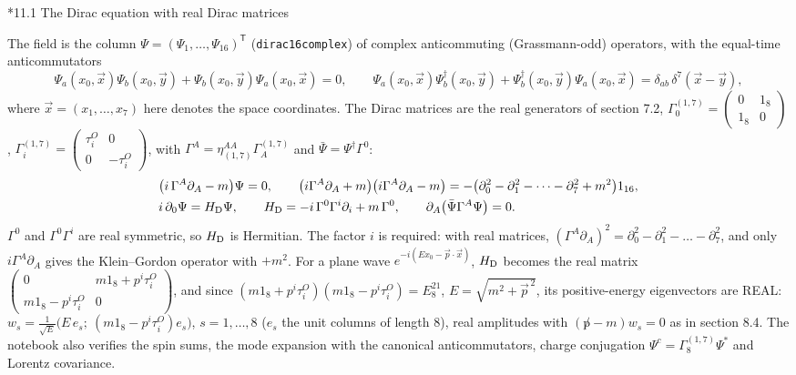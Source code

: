 \documentclass[10pt,a4paper]{article}
\makeatletter
\renewcommand\subsection{\@startsection{subsection}{2}{\z@}{-3.25ex\@plus -1ex \@minus -.2ex}{1.5ex \@plus .2ex}{\normalfont\large\bfseries\raggedright}}
\makeatother
\begin{document}
\subsection*{11.1 The Dirac equation with real Dirac matrices}
The field is the column $\Psi=(\Psi_1,\dots,\Psi_{16})^{\mathsf T}$ (\texttt{dirac16complex}) of complex anticommuting (Grassmann-odd) operators, with the equal-time anticommutators
\begin{equation*}
\Psi_a(x_0,\vec x)\Psi_b(x_0,\vec y)+\Psi_b(x_0,\vec y)\Psi_a(x_0,\vec x)=0,\qquad \Psi_a(x_0,\vec x)\Psi_b^\dagger(x_0,\vec y)+\Psi_b^\dagger(x_0,\vec y)\Psi_a(x_0,\vec x)=\delta_{ab}\,\delta^7(\vec x-\vec y),
\end{equation*}
where $\vec x=(x_1,\dots,x_7)$ here denotes the space coordinates. The Dirac matrices are the real generators of section 7.2, $\Gamma^{(1,7)}_0=\left(\begin{smallmatrix}0&1_8\\1_8&0\end{smallmatrix}\right)$, $\Gamma^{(1,7)}_i=\left(\begin{smallmatrix}\tau^{O}_i&0\\0&-\tau^{O}_i\end{smallmatrix}\right)$, with $\Gamma^{A}=\eta_{(1,7)}^{AA}\Gamma^{(1,7)}_A$ and $\bar\Psi=\Psi^\dagger\Gamma^{0}$:
\begin{align*}
&\big(i\,\Gamma^{A}\partial_A-m\big)\Psi=0,\qquad \big(i\Gamma^{A}\partial_A+m\big)\big(i\Gamma^{A}\partial_A-m\big)=-\big(\partial_0^2-\partial_1^2-\dots-\partial_7^2+m^2\big)1_{16}, \\
&i\,\partial_0\Psi=H_{\rm D}\Psi,\qquad H_{\rm D}=-i\,\Gamma^{0}\Gamma^{i}\partial_i+m\,\Gamma^{0},\qquad \partial_A\big(\bar\Psi\Gamma^{A}\Psi\big)=0 .
\end{align*}
$\Gamma^0$ and $\Gamma^0\Gamma^i$ are real symmetric, so $H_{\rm D}$ is Hermitian. The factor $i$ is required: with real matrices, $(\Gamma^A\partial_A)^2=\partial_0^2-\partial_1^2-\dots-\partial_7^2$, and only $i\Gamma^A\partial_A$ gives the Klein–Gordon operator with $+m^2$. For a plane wave $e^{-i(Ex_0-\vec p\cdot\vec x)}$, $H_{\rm D}$ becomes the real matrix $\left(\begin{smallmatrix}0&m1_8+p^i\tau^{O}_i\\m1_8-p^i\tau^{O}_i&0\end{smallmatrix}\right)$, and since $(m1_8+p^i\tau^{O}_i)(m1_8-p^i\tau^{O}_i)=E^21_8$, $E=\sqrt{m^2+\vec p^{\,2}}$, its positive-energy eigenvectors are REAL: $w_s=\frac1{\sqrt E}\big(E\,e_s;\ (m1_8-p^i\tau^{O}_i)e_s\big)$, $s=1,\dots,8$ ($e_s$ the unit columns of length 8), real amplitudes with $(\not p-m)w_s=0$ as in section 8.4. The notebook also verifies the spin sums, the mode expansion with the canonical anticommutators, charge conjugation $\Psi^c=\Gamma^{(1,7)}_8\Psi^*$ and Lorentz covariance.
\end{document}
